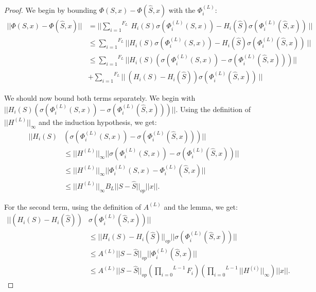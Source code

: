 \documentclass[11pt,a4paper]{article}
\newcommand{\op}[1]{|| #1 ||_{op}}
\newcommand{\ninf}[1]{|| #1 ||_\infty}
\newcommand{\Sum}[2]{\overset{#2}{\underset{#1}{\sum}}}
\newcommand{\Prod}[2]{\overset{#2}{\underset{#1}{\prod}}}
\theoremstyle{definition}
\renewcommand{\leq}{\leqslant}
\begin{document}
\begin{proof}
            We begin by bounding $\Phi(S,x) - \Phi(\hat{S},x)$ with the $\Phi^{(L)}_i$:
            \begin{align}
                || \Phi (S,x) - \Phi (\hat{S},x) || &= || \Sum{i=1}{F_L} \ H_i (S) \sigma(\Phi^{(L)}_i (S,x)) - H_i (\hat{S}) \sigma (\Phi^{(L)}_i (\hat{S},x)) \ || \nonumber \\
                &\leq \Sum{i=1}{F_L} || H_i (S) \sigma(\Phi^{(L)}_i (S,x)) - H_i (\hat{S}) \sigma (\Phi^{(L)}_i (\hat{S},x)) \ || \nonumber \\
                &\leq \Sum{i=1}{F_L}  || H_i (S) \left(\sigma(\Phi^{(L)}_i (S,x)) - \sigma (\Phi^{(L)}_i (\hat{S},x)) \right) || \nonumber \\
                &+  \Sum{i=1}{F_L} || \ (H_i(S) - H_i(\hat{S}) ) \sigma (\Phi^{(L)}_i (\hat{S},x)) \ || 
                \label{eq:bound_phi_raw}
            \end{align}

            We should now bound both terms separately. We begin with $|| H_i (S) \left(\sigma(\Phi^{(L)}_i (S,x)) - \sigma (\Phi^{(L)}_i (\hat{S},x)) \right) ||$. Using the definition of $\ninf{H^{(L)}}$ and the induction hypothesis, we get:
            \begin{align}
                || H_i (S) &\left(\sigma(\Phi^{(L)}_i (S,x)) - \sigma (\Phi^{(L)}_i (\hat{S},x)) \right) || \\ 
                &\leq \ninf{H^{(L)}} || \sigma(\Phi^{(L)}_i (S,x)) - \sigma (\Phi^{(L)}_i (\hat{S},x))|| \nonumber \\
                &\leq \ninf{H^{(L)}} || \Phi^{(L)}_i (S,x) - \Phi^{(L)}_i (\hat{S},x)|| \nonumber \\
                &\leq \ninf{H^{(L)}} B_L \op{S - \hat{S}} ||x||.\label{eq:bound_first_term}
            \end{align}

            For the second term, using the definition of $A^{(L)}$ and the lemma, we get:
            \begin{align}
                || (H_i(S) - H_i(\hat{S}) ) & \sigma (\Phi^{(L)}_i (\hat{S},x)) || \nonumber \\
                &\leq \op{H_i(S) - H_i(\hat{S})} ||\sigma (\Phi^{(L)}_i (\hat{S},x)) || \nonumber \\
                &\leq A^{(L)} \op{S-\hat{S}} ||\Phi^{(L)}_i (\hat{S},x)|| \nonumber \\
                &\leq A^{(L)} \op{S-\hat{S}} \left( \Prod{i=0}{L-1} F_i \right) \left( \Prod{i=0}{L-1} \ninf{H^{(i)}} \right) ||x||\label{eq:bound_second_term}.
            \end{align}



\end{proof}
\end{document}
